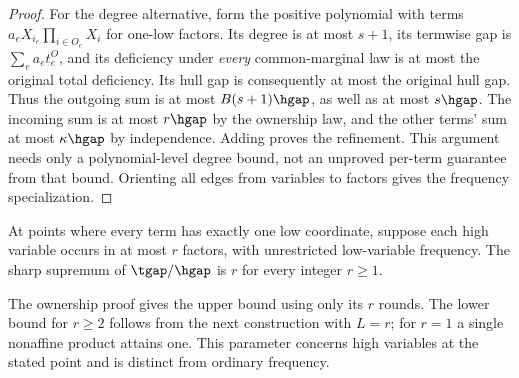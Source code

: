 \begin{proof}
For the degree alternative, form the positive polynomial with terms
$a_eX_{i_e}\prod_{i\in O_e}X_i$ for one-low factors. Its degree is at most
$s+1$, its termwise gap is $\sum_e a_et_e^O$, and its deficiency under
\emph{every} common-marginal law is at most the original total deficiency.
Its hull gap is consequently at most the original hull gap. Thus the
outgoing sum is at most $B(s+1)\hgap$, as well as at most $s\hgap$.
The incoming sum is at most $r\hgap$ by the ownership law, and the other
terms' sum at most $\kappa\hgap$ by independence. Adding proves the
refinement. This argument needs only a polynomial-level degree bound,
not an unproved per-term guarantee from that bound. Orienting all edges
from variables to factors gives the frequency specialization.
\end{proof}

\begin{corollary}\label{cor:ownership-sharp}
At points where every term has exactly one low coordinate, suppose each
high variable occurs in at most $r$ factors, with unrestricted low-variable
frequency. The sharp supremum of $\tgap/\hgap$ is $r$ for every integer
$r\ge1$.
\end{corollary}
The ownership proof gives the upper bound using only its $r$ rounds.
The lower bound for $r\ge2$ follows from the next construction with $L=r$;
for $r=1$ a single nonaffine product attains one. This parameter concerns
high variables at the stated point and is distinct from ordinary frequency.

